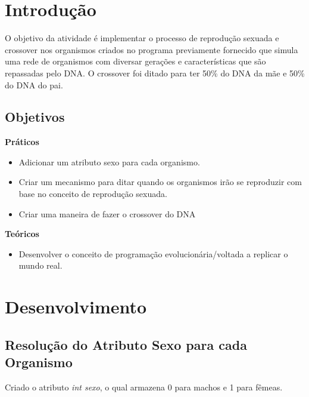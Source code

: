 \documentclass[
	12pt,				%
	oneside,			%
	a4paper,			%
	english,			%
	brazil,				%
	]{abntex2}
\begin{document}
\frenchspacing 

\imprimircapa

{
\ABNTEXchapterfont

\textual

\section{Introdução}

O objetivo da atividade é implementar o processo de reprodução sexuada e crossover nos organismos criados no programa previamente fornecido que simula uma rede de organismos com diversar gerações e características que são repassadas pelo DNA. O crossover foi ditado para ter 50\% do DNA da mãe e 50\% do DNA do pai.

\subsection{Objetivos}

\textbf{Práticos}
\begin{itemize}
\item Adicionar um atributo sexo para cada organismo.
\item Criar um mecanismo para ditar quando os organismos irão se reproduzir com base no conceito de reprodução sexuada.
\item Criar uma maneira de fazer o crossover do DNA
\end{itemize}

\textbf{Teóricos}
\begin{itemize}
    \item Desenvolver o conceito de programação evolucionária/voltada a replicar o mundo real.
\end{itemize}
\section{Desenvolvimento}

\subsection{Resolução do Atributo Sexo para cada Organismo}

Criado o atributo \textit{int sexo}, o qual armazena 0 para machos e 1 para fêmeas.

}
\end{document}
